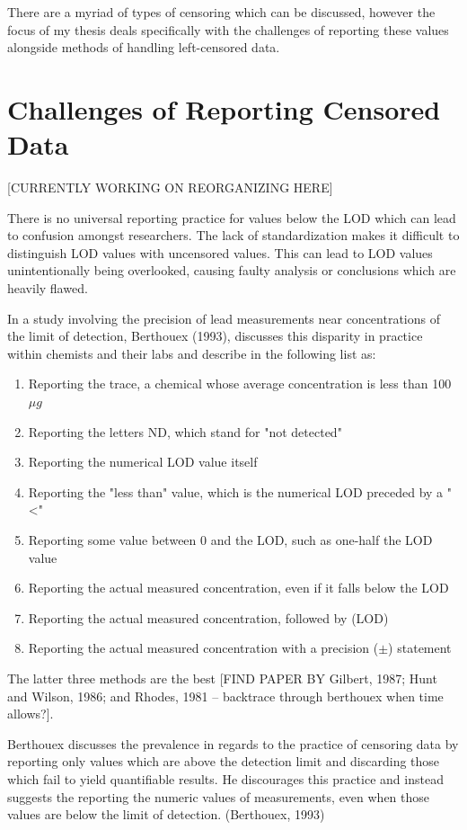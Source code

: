 \documentclass[12pt, twoside]{amherstthesis}
\begin{document}
There are a myriad of types of censoring which can be discussed, however the focus of my thesis deals specifically with the challenges of reporting these values alongside methods of handling left-censored data.

\hypertarget{challenges}{%
\section{Challenges of Reporting Censored Data}\label{challenges}}

{[}CURRENTLY WORKING ON REORGANIZING HERE{]}

There is no universal reporting practice for values below the LOD which can lead to confusion amongst researchers. The lack of standardization makes it difficult to distinguish LOD values with uncensored values. This can lead to LOD values unintentionally being overlooked, causing faulty analysis or conclusions which are heavily flawed.

In a study involving the precision of lead measurements near concentrations of the limit of detection, Berthouex (1993), discusses this disparity in practice within chemists and their labs and describe in the following list as:
\begin{enumerate}
  \item Reporting the trace, a chemical whose average concentration is less than 100 $\mu g$
  \item Reporting  the letters ND, which stand for "not detected"
  \item Reporting the numerical LOD value itself
  \item Reporting the "less than" value, which is the numerical LOD preceded by a "<"
  \item Reporting some value between 0 and the LOD, such as one-half the LOD value
  \item Reporting the actual measured concentration, even if it falls below the LOD
  \item Reporting the actual measured concentration, followed by (LOD)
  \item Reporting the actual measured concentration with a precision ($\pm$) statement
\end{enumerate}
The latter three methods are the best {[}FIND PAPER BY Gilbert, 1987; Hunt and Wilson, 1986; and Rhodes, 1981 -- backtrace through berthouex when time allows?{]}.

Berthouex discusses the prevalence in regards to the practice of censoring data by reporting only values which are above the detection limit and discarding those which fail to yield quantifiable results. He discourages this practice and instead suggests the reporting the numeric values of measurements, even when those values are below the limit of detection. (Berthouex, 1993)
\end{document}
